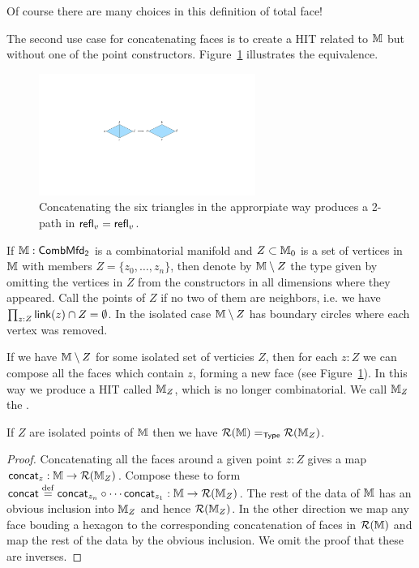 Of course there are many choices in this definition of total face!

The second use case for concatenating faces is to create a HIT related to \( \mathbb{M} \) but without one of the point constructors. Figure~\ref{fig:hex_concat} illustrates the equivalence.
\begin{figure}[htbp]
\centering
\includegraphics[width=200pt]{hex_concat.pdf}
\caption{Concatenating the six triangles in the approrpiate way produces a 2-path in \( \mathsf{refl}_v=\mathsf{refl}_v \).}
\label{fig:hex_concat}
\end{figure}

\begin{mydef}
If \( \mathbb{M}:\mathsf{CombMfd_2} \) is a combinatorial manifold and \( Z\subset \mathbb{M}_0 \) is a set of vertices in \( \mathbb{M} \) with members \( Z=\{z_0,\ldots,z_n\} \), then denote by \( \mathbb{M}\setminus Z \) the type given by omitting the vertices in \( Z \) from the constructors in all dimensions where they appeared. Call the points of \( Z \)  if no two of them are neighbors, i.e. we have \( \prod_{z:Z}\operatorname{\mathsf{link}}(z)\cap Z=\emptyset \). In the isolated case \( \mathbb{M}\setminus Z \) has boundary circles where each vertex was removed.
\end{mydef}

\begin{mydef}
\label{def:replacement}
If we have \( \mathbb{M}\setminus Z \) for some isolated set of verticies \( Z \), then for each \( z:Z \) we can compose all the faces which contain \( z \), forming a new face (see Figure~\ref{fig:hex_concat}). In this way we produce a HIT called \( \mathbb{M}_Z \), which is no longer combinatorial. We call \( \mathbb{M}_Z \) the .
\end{mydef}

\begin{mylemma}
If \( Z \) are isolated points of \( \mathbb{M} \) then we have \( \mathcal{R}(\mathbb{M})=_{\mathsf{Type}}\mathcal{R}(\mathbb{M}_Z) \).
\end{mylemma}
\begin{proof}
Concatenating all the faces around a given point \( z:Z \) gives a map \( \mathsf{concat}_z:\mathbb{M}\to\mathcal{R}(\mathbb{M}_Z) \). Compose these to form \( \mathsf{concat}\stackrel{\mathrm{def}}{=}\mathsf{concat}_{z_n}\circ\cdots\mathsf{concat}_{z_1}:\mathbb{M}\to\mathcal{R}(\mathbb{M}_Z) \). The rest of the data of \( \mathbb{M} \) has an obvious inclusion into \( \mathbb{M}_Z \) and hence \( \mathcal{R}(\mathbb{M}_Z) \).  In the other direction we map any face bouding a hexagon to the corresponding concatenation of faces in \( \mathcal{R}(\mathbb{M}) \) and map the rest of the data by the obvious inclusion. We omit the proof that these are inverses.
\end{proof}

